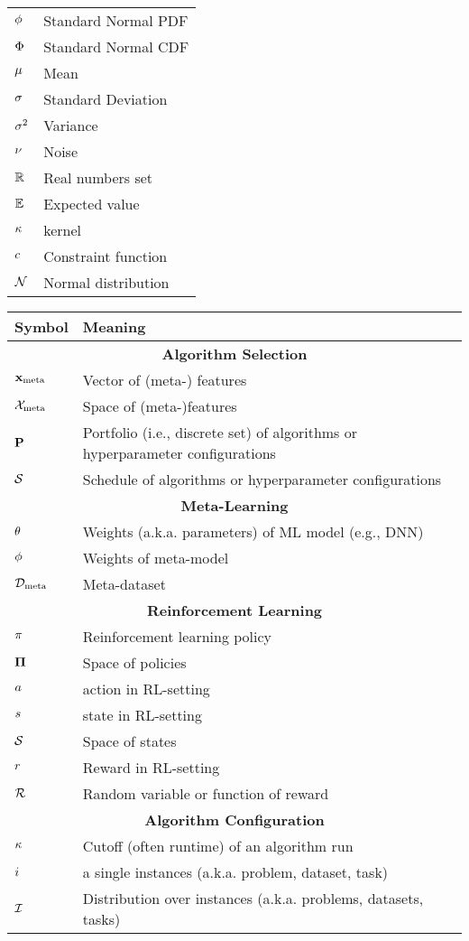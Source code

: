 \documentclass[]{report}
\begin{document}
\begin{table}
\begin{tabular}{ll}
		$\phi$ & Standard Normal PDF \\
		$\Phi$ & Standard Normal CDF \\
		$\mu$ & Mean \\
		$\sigma$ & Standard Deviation \\
		$\sigma^2$ & Variance \\
		$\nu$ & Noise \\
		$\mathbb{R}$ & Real numbers set \\
		$\mathbb{E}$ & Expected value \\
		$\kappa$ & kernel \\
		$c$ & Constraint function \\
		$\mathcal{N}$ & Normal distribution \\
		\bottomrule
\end{tabular}
\end{table}

\begin{table}
	\begin{tabular}{ll}
		\toprule
		Symbol & Meaning \\
		\midrule
		\multicolumn{2}{c}{\textbf{Algorithm Selection}}\\
		$\mathbf{x}_{\text{meta}}$ & Vector of (meta-) features\\
		$\mathcal{X}_{\text{meta}}$ & Space of (meta-)features \\
		$\mathbf{P}$ & Portfolio (i.e., discrete set) of algorithms or hyperparameter configurations\\
		$\mathcal{S}$ & Schedule of algorithms or hyperparameter configurations\\
		\midrule
		\multicolumn{2}{c}{\textbf{Meta-Learning}}\\
		$\theta$ & Weights (a.k.a. parameters) of ML model (e.g., DNN)\\
		$\phi$ & Weights of meta-model\\
    	$\mathcal{D}_{\text{meta}}$ & Meta-dataset\\
		\midrule
		\multicolumn{2}{c}{\textbf{Reinforcement Learning}}\\
		$\pi$ & Reinforcement learning policy\\
		$\mathbf{\Pi}$ & Space of policies\\
		$a$ & action in RL-setting\\
		$s$ & state in RL-setting\\
		$\mathcal{S}$ & Space of states\\
		$r$ & Reward in RL-setting\\
		$\mathcal{R}$ & Random variable or function of reward\\
		\midrule
		\multicolumn{2}{c}{\textbf{Algorithm Configuration}}\\
		$\kappa$ & Cutoff (often runtime) of an algorithm run\\
		$i$ & a single instances (a.k.a. problem, dataset, task)\\
		$\mathcal{I}$ & Distribution over instances (a.k.a. problems, datasets, tasks)\\
		\bottomrule
	\end{tabular}
\end{table}
\end{document}
